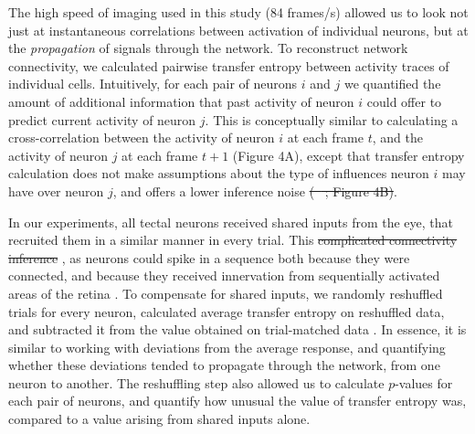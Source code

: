 \documentclass{article}
\providecommand{\DIFaddtex}[1]{{\protect\color{blue}{#1}}} %
\providecommand{\DIFdeltex}[1]{{\protect\color{red}\sout{#1}}}                      %
\providecommand{\DIFaddbegin}{} %
\providecommand{\DIFaddend}{} %
\providecommand{\DIFdelbegin}{} %
\providecommand{\DIFdelend}{} %
\providecommand{\DIFadd}[1]{\texorpdfstring{\DIFaddtex{#1}}{#1}} %
\providecommand{\DIFdel}[1]{\texorpdfstring{\DIFdeltex{#1}}{}} %
\newcommand{\DIFscaledelfig}{0.5}
\newlength{\DIFdelgraphicswidth} %
\newlength{\DIFdelgraphicsheight} %
\newcommand{\DIFaddincludegraphics}[2][]{{\color{blue}\fbox{\DIFOincludegraphics[#1]{#2}}}} %
\newcommand{\DIFdelincludegraphics}[2][]{%
\sbox{\DIFdelgraphicsbox}{\DIFOincludegraphics[#1]{#2}}%
\settoboxwidth{\DIFdelgraphicswidth}{\DIFdelgraphicsbox} %
\settoboxtotalheight{\DIFdelgraphicsheight}{\DIFdelgraphicsbox} %
\scalebox{\DIFscaledelfig}{%
\parbox[b]{\DIFdelgraphicswidth}{\usebox{\DIFdelgraphicsbox}\\[-\baselineskip] \rule{\DIFdelgraphicswidth}{0em}}\llap{\resizebox{\DIFdelgraphicswidth}{\DIFdelgraphicsheight}{%
\setlength{\unitlength}{\DIFdelgraphicswidth}%
\begin{picture}(1,1)%
\thicklines\linethickness{2pt} %
{\color[rgb]{1,0,0}\put(0,0){\framebox(1,1){}}}%
{\color[rgb]{1,0,0}\put(0,0){\line( 1,1){1}}}%
{\color[rgb]{1,0,0}\put(0,1){\line(1,-1){1}}}%
\end{picture}%
}\hspace*{3pt}}} %
} %
\DeclareRobustCommand{\DIFaddbegin}{\DIFOaddbegin \let\includegraphics\DIFaddincludegraphics} %
\DeclareRobustCommand{\DIFaddend}{\DIFOaddend \let\includegraphics\DIFOincludegraphics} %
\DeclareRobustCommand{\DIFdelbegin}{\DIFOdelbegin \let\includegraphics\DIFdelincludegraphics} %
\DeclareRobustCommand{\DIFdelend}{\DIFOaddend \let\includegraphics\DIFOincludegraphics} %
\begin{document}
The high speed of imaging used in this study (84 frames/s) allowed us to look not just at instantaneous correlations between activation of individual neurons, but at the \textit{propagation} of signals through the network. To reconstruct network connectivity, we calculated pairwise transfer entropy \citep{gourevitch2007te, stetter2012te} between activity traces of individual cells. Intuitively, for each pair of neurons $i$ and $j$ we quantified the amount of additional information that past activity of neuron $i$ could offer to predict current activity of neuron $j$. This is conceptually similar to calculating a cross-correlation between the activity of neuron $i$ at each frame $t$, and the activity of neuron $j$ at each \DIFaddbegin \DIFadd{consecutive }\DIFaddend frame $t+1$ (Figure 4A), except that transfer entropy calculation \DIFaddbegin \DIFadd{(Figure 4B) }\DIFaddend does not make assumptions about the type of influences neuron $i$ may have over neuron $j$, and offers a lower inference noise \DIFdelbegin \DIFdel{(\mbox{%
\citealt{stetter2012te}}\hspace{0pt}%
; Figure 4B)}\DIFdelend \DIFaddbegin \DIFadd{\mbox{%
\citep{stetter2012te}}\hspace{0pt}%
}\DIFaddend .

In our experiments, all tectal neurons received shared inputs from the eye, that recruited them in a similar manner in every trial. This \DIFdelbegin \DIFdel{complicated connectivity inference }\DIFdelend \DIFaddbegin \DIFadd{made the connectivity inference more complicated}\DIFaddend , as neurons could spike in a sequence both because they were connected, and because they received innervation from sequentially activated areas of the retina \citep{mehler2018lure}. To compensate for shared inputs, we randomly reshuffled trials for every neuron, calculated average transfer entropy on reshuffled data, and subtracted it from the value obtained on trial-matched data \citep{gourevitch2007te, wollstadt2014te}. In essence, it is similar to working with deviations from the average response, and quantifying whether these deviations tended to propagate through the network, from one neuron to another. The reshuffling step also allowed us to calculate $p$-values for each pair of neurons, and quantify how unusual the value of transfer entropy was, compared to a value arising from shared inputs alone.
\end{document}
